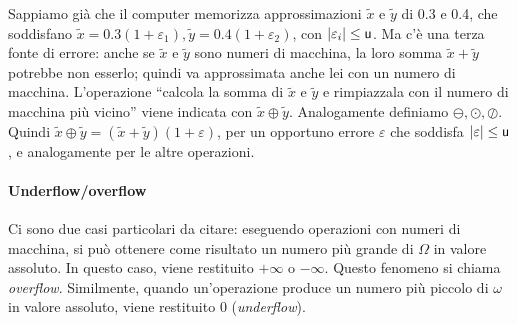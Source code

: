 \documentclass[a4paper]{report}
\DeclarePairedDelimiter{\abs}{\lvert}{\rvert}
\theoremstyle{definiton}
\theoremstyle{remark}
\begin{document}
Sappiamo già che il computer memorizza approssimazioni $\tilde{x}$ e $\tilde{y}$ di 0.3 e 0.4, che soddisfano $\tilde{x} = 0.3(1+\varepsilon_1), \tilde{y} = 0.4(1+\varepsilon_2)$, con $\abs{\varepsilon_i} \leq \mathsf{u}$. Ma c'è una terza fonte di errore: anche se $\tilde{x}$ e $\tilde{y}$ sono numeri di macchina, la loro somma $\tilde{x} + \tilde{y}$ potrebbe non esserlo; quindi va approssimata anche lei con un numero di macchina. L'operazione ``calcola la somma di $\tilde{x}$ e $\tilde{y}$ e rimpiazzala con il numero di macchina più vicino'' viene indicata con $\tilde{x} \oplus \tilde{y}$. Analogamente definiamo $\ominus, \odot, \oslash$. Quindi $ \tilde{x} \oplus \tilde{y} = (\tilde{x}+\tilde{y})(1+\varepsilon)$, per un opportuno errore $\varepsilon$ che soddisfa $\abs{\varepsilon} \leq \mathsf{u}$, e analogamente per le altre operazioni.

\paragraph{Underflow/overflow} Ci sono due casi particolari da citare: eseguendo operazioni con numeri di macchina, si può ottenere come risultato un numero più grande di $\Omega$ in valore assoluto. In questo caso, viene restituito $+\infty$ o $-\infty$. Questo fenomeno si chiama \emph{overflow}. Similmente, quando un'operazione produce un numero più piccolo di $\omega$ in valore assoluto, viene restituito $0$ (\emph{underflow}).
\end{document}
